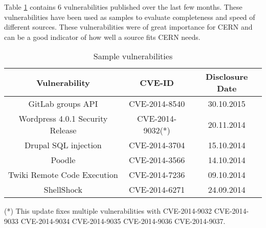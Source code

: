 Table \ref{table:sample_vulns} contains 6 vulnerabilities published over the last few months. These vulnerabilities have been used as samples to evaluate completeness and speed of different sources. These vulnerabilities were of great importance for CERN and can be a good indicator of how well a source fits CERN needs.
\begin{table}
\begin{center}
    \begin{tabular}{ | c | c | c| }
    
    \hline
    Vulnerability & CVE-ID & Disclosure Date 
    \\ \hline
    GitLab groups API & CVE-2014-8540 & 30.10.2015
      \\ \hline
    Wordpress 4.0.1 Security Release & CVE-2014-9032(*)  & 20.11.2014
    \\ \hline
    Drupal SQL injection
 & CVE-2014-3704
 & 15.10.2014 
  \\
    \hline

 Poodle
 & CVE-2014-3566
 & 14.10.2014
  \\
    \hline

Twiki Remote Code Execution
 & CVE-2014-7236
 & 09.10.2014
 \\
    \hline

ShellShock
 & CVE-2014-6271
 & 24.09.2014
  \\
    \hline

    \end{tabular}
    \caption{Sample vulnerabilities}
    \label{table:sample_vulns}
   \end{center}
    \footnotesize{(*) This update fixes multiple vulnerabilities with CVE-2014-9032 CVE-2014-9033 CVE-2014-9034 CVE-2014-9035 CVE-2014-9036 CVE-2014-9037.}
\end{table}


